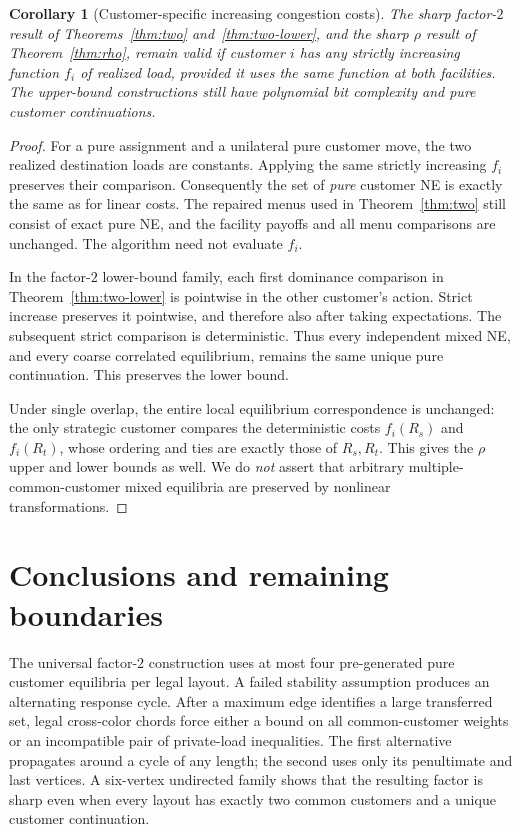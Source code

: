 \documentclass[11pt]{article}
\newtheorem{corollary}[theorem]{Corollary}
\theoremstyle{definition}
\theoremstyle{remark}
\newcommand{\rhoG}{\rho}
\begin{document}
\begin{corollary}[Customer-specific increasing congestion costs]\label{cor:nonlinear}
The sharp factor-$2$ result of Theorems~\ref{thm:two} and~\ref{thm:two-lower}, and the sharp $\rhoG$ result of Theorem~\ref{thm:rho}, remain valid if customer $i$ has any strictly increasing function $f_i$ of realized load, provided it uses the same function at both facilities. The upper-bound constructions still have polynomial bit complexity and pure customer continuations.
\end{corollary}
\begin{proof}
For a pure assignment and a unilateral pure customer move, the two realized destination loads are constants. Applying the same strictly increasing $f_i$ preserves their comparison. Consequently the set of \emph{pure} customer NE is exactly the same as for linear costs. The repaired menus used in Theorem~\ref{thm:two} still consist of exact pure NE, and the facility payoffs and all menu comparisons are unchanged. The algorithm need not evaluate $f_i$.

In the factor-$2$ lower-bound family, each first dominance comparison in Theorem~\ref{thm:two-lower} is pointwise in the other customer's action. Strict increase preserves it pointwise, and therefore also after taking expectations. The subsequent strict comparison is deterministic. Thus every independent mixed NE, and every coarse correlated equilibrium, remains the same unique pure continuation. This preserves the lower bound.

Under single overlap, the entire local equilibrium correspondence is unchanged: the only strategic customer compares the deterministic costs $f_i(R_s)$ and $f_i(R_t)$, whose ordering and ties are exactly those of $R_s,R_t$. This gives the $\rhoG$ upper and lower bounds as well. We do \emph{not} assert that arbitrary multiple-common-customer mixed equilibria are preserved by nonlinear transformations.
\end{proof}

\section{Conclusions and remaining boundaries}

The universal factor-$2$ construction uses at most four pre-generated pure customer equilibria per legal layout. A failed stability assumption produces an alternating response cycle. After a maximum edge identifies a large transferred set, legal cross-color chords force either a bound on all common-customer weights or an incompatible pair of private-load inequalities. The first alternative propagates around a cycle of any length; the second uses only its penultimate and last vertices. A six-vertex undirected family shows that the resulting factor is sharp even when every layout has exactly two common customers and a unique customer continuation.
\end{document}

